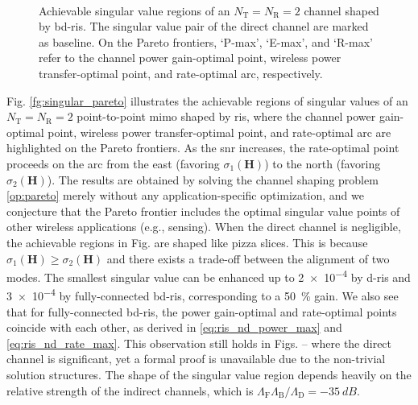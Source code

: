 \documentclass[
	fontsize=11pt,
	paper=a4,
	foldmarks=false
]{scrartcl}
\begin{document}
\begin{reviewer}
{{\begin{figure}[H]
{{					}
				}
				\\
				\caption{Achievable singular value regions of an $N_\mathrm{T}=N_\mathrm{R}=2$ channel shaped by \gls{bd}-\gls{ris}. The singular value pair of the direct channel are marked as baseline.
				On the Pareto frontiers, `P-max', `E-max', and `R-max' refer to the channel power gain-optimal point, wireless power transfer-optimal point, and rate-optimal arc, respectively.}
			\end{figure}
			Fig. \ref{fg:singular_pareto} illustrates the achievable regions of singular values of an $N_\mathrm{T}=N_\mathrm{R}=2$ point-to-point \gls{mimo} shaped by \gls{ris}, where the channel power gain-optimal point, wireless power transfer-optimal point, and rate-optimal arc are highlighted on the Pareto frontiers.
			As the \gls{snr} increases, the rate-optimal point proceeds on the arc from the east (favoring $\sigma_1(\mathbf{H})$) to the north (favoring $\sigma_2(\mathbf{H})$).
			The results are obtained by solving the channel shaping problem \eqref{op:pareto} merely without any application-specific optimization, and we conjecture that the Pareto frontier includes the optimal singular value points of other wireless applications (e.g., sensing).
			When the direct channel is negligible, the achievable regions in Fig.  are shaped like pizza slices.
			This is because $\sigma_1(\mathbf{H}) \ge \sigma_2(\mathbf{H})$ and there exists a trade-off between the alignment of two modes.
			The smallest singular value can be enhanced up to \num{2e-4} by \gls{d}-\gls{ris} and \num{3e-4} by fully-connected \gls{bd}-\gls{ris}, corresponding to a \qty{50}{\percent} gain.
			We also see that for fully-connected \gls{bd}-\gls{ris}, the power gain-optimal and rate-optimal points coincide with each other, as derived in  \eqref{eq:ris_nd_power_max} and \eqref{eq:ris_nd_rate_max}.
			This observation still holds in Figs.  --  where the direct channel is significant, yet a formal proof is unavailable due to the non-trivial solution structures.
			The shape of the singular value region depends heavily on the relative strength of the indirect channels, which is $\Lambda_\mathrm{F}\Lambda_\mathrm{B}/\Lambda_\mathrm{D}=\qty{-35}{dB}$.
}}
\end{reviewer}
\end{document}
